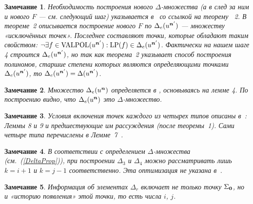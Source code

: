 \documentclass[14pt]{extarticle}
\newtheorem{note}{Замечание}
\begin{document}
\begin{enumerate}
   \begin{note}\label{NewDeltaNote}
      Необходимость построения нового $\Delta$-\nspace множества (а в след за ним и
      нового $F$ — см. следующий шаг) указывается
      в~\cite[п.~5, шаг~2]{Sakata88} со ссылкой на теорему ~2. В теореме~2
      описывается построение нового $F$ по $\Delta_e(u^{\boldsymbol{n}'})$ —
      множеству «исключённых точек». Последнее составляют точки, которые
      обладают таким свойством: $\lnot \exists f \in \operatorname{VALPOL}(u^{\boldsymbol{n}'}): \operatorname{LP}(f)
      \in \Delta_e(u^{\boldsymbol{n}'})$. Фактически на нашем шаге 4 строится $\Delta_e(
      u^{\boldsymbol{n}'} )$, но так как теорема~2 указывает способ построения полиномов,
      старшие степени которых являются определяющими точками $\Delta_e(u^{\boldsymbol{n}'})$, то $\Delta_e(u^{\boldsymbol{n}'}) = \Delta(u^{\boldsymbol{n}'})$.
   \end{note}

   \begin{note}
      Множество $\Delta_e(u^{\boldsymbol{n}})$ определяется в \cite[стр.~327]{Sakata88},
      основываясь на лемме 4. По построению видно, что $\Delta_e(u^{\boldsymbol{n}})$
      это $\Delta$-множество. %
   \end{note}

   \begin{note}
      Условия включения точек каждого из четырех типов описаны
      в~\cite{Sakata88}: Леммы 8 и 9 и предшествующие им
      рассуждения (после теоремы~1). Сами четыре типа перечислены в
      Лемме~7~\cite{Sakata88}.
   \end{note}
   
   \begin{note}
   		В соответствии с определением $\Delta$-множества (см.~(\ref{DeltaProp})),
   		при построении $\Delta_3$ и $\Delta_4$ можно рассматривать лишь $k=i+1$ 
   		и $k=j-1$ соответственно. Эта оптимизация не указана в~\cite{Sakata88}.
   \end{note}
   
   \begin{note}
   		Информация об элементах $\Delta_r$ включает не только точку $\Sigma_{\boldsymbol{0}}$, 
   		но и «историю появления» этой точки, то есть числа $i$, $j$.
   \end{note}
   

\end{enumerate}
\end{document}
